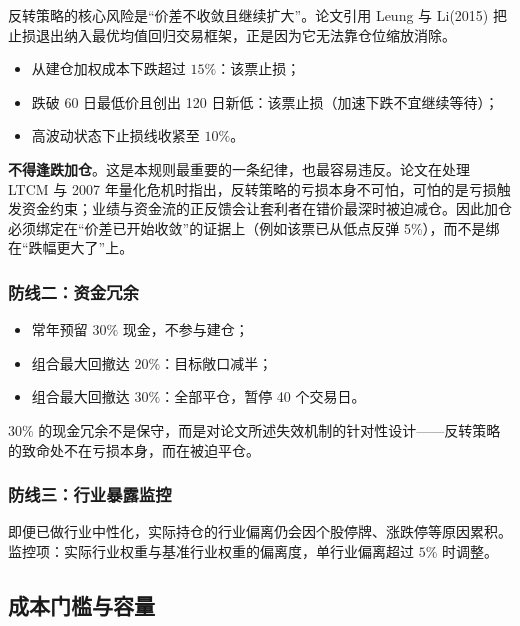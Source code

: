 反转策略的核心风险是“价差不收敛且继续扩大”。论文引用 Leung 与 Li(2015) 把止损退出纳入最优均值回归交易框架，正是因为它无法靠仓位缩放消除\cite{leungli2015}。

\begin{itemize}[leftmargin=2.2em]
  \item 从建仓加权成本下跌超过 $15\%$：该票止损；
  \item 跌破 60 日最低价且创出 120 日新低：该票止损（加速下跌不宜继续等待）；
  \item 高波动状态下止损线收紧至 $10\%$。
\end{itemize}

\textbf{不得逢跌加仓}。这是本规则最重要的一条纪律，也最容易违反。论文在处理 LTCM 与 2007 年量化危机时指出，反转策略的亏损本身不可怕，可怕的是亏损触发资金约束；业绩与资金流的正反馈会让套利者在错价最深时被迫减仓\cite{shleifervishny1997,khandanilo2011,brunnermeier2009}。因此加仓必须绑定在“价差已开始收敛”的证据上（例如该票已从低点反弹 5\%），而不是绑在“跌幅更大了”上。

\subsubsection*{防线二：资金冗余}

\begin{itemize}[leftmargin=2.2em]
  \item 常年预留 $30\%$ 现金，不参与建仓；
  \item 组合最大回撤达 $20\%$：目标敞口减半；
  \item 组合最大回撤达 $30\%$：全部平仓，暂停 40 个交易日。
\end{itemize}

$30\%$ 的现金冗余不是保守，而是对论文所述失效机制的针对性设计——反转策略的致命处不在亏损本身，而在被迫平仓。

\subsubsection*{防线三：行业暴露监控}

即便已做行业中性化，实际持仓的行业偏离仍会因个股停牌、涨跌停等原因累积。监控项：实际行业权重与基准行业权重的偏离度，单行业偏离超过 $5\%$ 时调整。

\subsection{成本门槛与容量}

